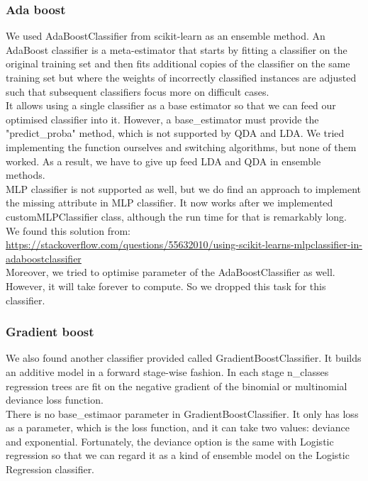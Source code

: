 \documentclass{article}
\begin{document}
\subsubsection{Ada boost}
We used AdaBoostClassifier from scikit-learn as an ensemble method. An AdaBoost classifier is a meta-estimator that starts by fitting a classifier on the original training set and then fits additional copies of the classifier on the same training set but where the weights of incorrectly classified instances are adjusted such that subsequent classifiers focus more on difficult cases.\cite{5}\\
It allows using a single classifier as a base estimator so that we can feed our optimised classifier into it. However, a base\_estimator must provide the "predict\_proba" method, which is not supported by QDA and LDA. We tried implementing the function ourselves and switching algorithms, but none of them worked. As a result, we have to give up feed LDA and QDA in ensemble methods. \\
MLP classifier is not supported as well, but we do find an approach to implement the missing attribute in MLP classifier. It now works after we implemented customMLPClassifier class, although the run time for that is remarkably long. We found this solution from: \url{https://stackoverflow.com/questions/55632010/using-scikit-learns-mlpclassifier-in-adaboostclassifier}\\
Moreover, we tried to optimise parameter of the AdaBoostClassifier as well. However, it will take forever to compute. So we dropped this task for this classifier.

\subsubsection{Gradient boost}
We also found another classifier provided called GradientBoostClassifier. It builds an additive model in a forward stage-wise fashion. In each stage n\_classes regression trees are fit on the negative gradient of the binomial or multinomial deviance loss function. \cite{5}\\
There is no base\_estimaor parameter in GradientBoostClassifier. It only has loss as a parameter, which is the loss function, and it can take two values: deviance and exponential. Fortunately, the deviance option is the same with Logistic regression so that we can regard it as a kind of ensemble model on the Logistic Regression classifier.
\end{document}
